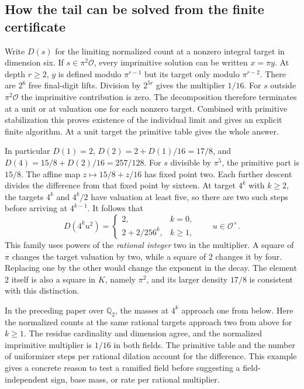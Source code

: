 \documentclass[12pt,letterpaper]{article}
\begin{document}
\subsection{How the tail can be solved from the finite certificate}
Write $D(s)$ for the limiting normalized count at a nonzero integral target in dimension six. If $s\in\pi^2\mathcal O$, every imprimitive solution can be written $x=\pi y$. At depth $r\ge2$, $y$ is defined modulo $\pi^{r-1}$ but its target only modulo $\pi^{r-2}$. There are $2^6$ free final-digit lifts. Division by $2^{5r}$ gives the multiplier $1/16$. For $s$ outside $\pi^2\mathcal O$ the imprimitive contribution is zero. The decomposition therefore terminates at a unit or at valuation one for each nonzero target. Combined with primitive stabilization this proves existence of the individual limit and gives an explicit finite algorithm. At a unit target the primitive table gives the whole answer.

In particular $D(1)=2$, $D(2)=2+D(1)/16=17/8$, and $D(4)=15/8+D(2)/16=257/128$. For $s$ divisible by $\pi^5$, the primitive part is $15/8$. The affine map $z\mapsto 15/8+z/16$ has fixed point two. Each further descent divides the difference from that fixed point by sixteen. At target $4^k$ with $k\ge2$, the targets $4^k$ and $4^k/2$ have valuation at least five, so there are two such steps before arriving at $4^{k-1}$. It follows that
\[
 D(4^k u^2)=
 \begin{cases}
 2,& k=0,\\[2pt]
 2+2/256^k,& k\ge1 ,
 \end{cases}\qquad u\in\mathcal O^\times .
\]
This family uses powers of the \emph{rational integer} two in the multiplier. A square of $\pi$ changes the target valuation by two, while a square of $2$ changes it by four. Replacing one by the other would change the exponent in the decay. The element $2$ itself is also a square in $K$, namely $\pi^2$, and its larger density $17/8$ is consistent with this distinction.

In the preceding paper over $\mathbb Q_2$, the masses at $4^k$ approach one from below. Here the normalized counts at the same rational targets approach two from above for $k\ge1$. The residue cardinality and dimension agree, and the normalized imprimitive multiplier is $1/16$ in both fields. The primitive table and the number of uniformizer steps per rational dilation account for the difference. This example gives a concrete reason to test a ramified field before suggesting a field-independent sign, base mass, or rate per rational multiplier.
\end{document}
